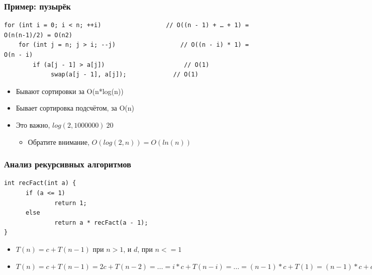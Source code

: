 \documentclass[xetex,mathserif,serif]{beamer}
\begin{document}
        \begin{frame}[fragile]
		\frametitle{Пример: пузырёк}        
		\begin{footnotesize}
			\begin{verbatim}
for (int i = 0; i < n; ++i)                  // O((n - 1) + … + 1) = O(n(n-1)/2) = O(n2)
    for (int j = n; j > i; --j)                  // O((n - i) * 1) = O(n - i)
        if (a[j - 1] > a[j])                      // O(1)
             swap(a[j - 1], a[j]);             // O(1)
			\end{verbatim}
		\end{footnotesize}

		\begin{itemize}
			\item Бывают сортировки за O(n*log(n))
			\item Бывает сортировка подсчётом, за O(n)
			\item Это важно, $log(2, 1000000) ~ 20$
			\begin{itemize}
				\item Обратите внимание, $O(log(2, n)) = O(ln(n))$
			\end{itemize}
		\end{itemize}
	\end{frame}

	\begin{frame}[fragile]
		\frametitle{Анализ рекурсивных алгоритмов}
		\begin{footnotesize}
			\begin{verbatim}
int recFact(int a) {
      if (a <= 1)
              return 1;
      else
              return a * recFact(a - 1);
}
			\end{verbatim}
		\end{footnotesize}
		\begin{itemize}
			\item $T(n) = c + T(n-1)$ при $n > 1$, и $d$, при $n <= 1$
			\item $T(n) = c + T(n-1) = 2c + T(n-2) = ... = i*c + T(n-i) = ... = (n-1)*c + T(1) = (n-1)*c+d$
		\end{itemize}
	\end{frame}
        
\end{document}

